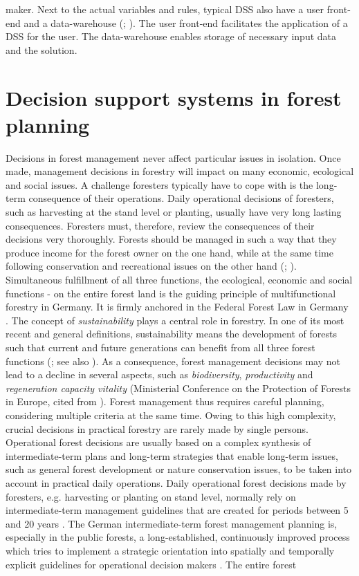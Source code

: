 maker. Next to the actual variables and rules, typical DSS also have a user front-end and a data-warehouse (\citealp[p. 2]{hansen_2012}; \citealp[p. 115]{shim_2002}). The user front-end facilitates the application of a DSS for the user. The data-warehouse enables storage of necessary input data and the solution.

\section{Decision support systems in forest planning}
\label{sec:intro:dss}
Decisions in forest management never affect particular issues in isolation. Once made, management decisions in forestry will impact on many economic, ecological and social issues. A challenge foresters typically have to cope with is the long-term consequence of their operations. Daily operational decisions of foresters, such as harvesting at the stand level or planting, usually have very long lasting consequences. Foresters must, therefore, review the consequences of their decisions very thoroughly. Forests should be managed in such a way that they produce income for the forest owner on the one hand, while at the same time following conservation and recreational issues on the other hand (\citealp[p. 11]{kangas_2015}; \citealp[p. 67]{mohring_1997}). Simultaneous fulfillment of all three functions, the ecological, economic and social functions - on the entire forest land is the guiding principle of multifunctional forestry in Germany. It is firmly anchored in the Federal Forest Law in Germany \citep[p. 457]{moller_2007}. The concept of \textit{sustainability} plays a central role in forestry. In one of its most recent and general definitions, sustainability means the development of forests such that current and future generations can benefit from all three forest functions (\citealp[p. 14]{un_2005}; see also \citealp[p. 14]{kangas_2015}). As a consequence, forest management decisions may not lead to a decline in several aspects, such as \textit{biodiversity}, \textit{productivity} and \textit{regeneration capacity vitality} (Ministerial Conference on the Protection of Forests in Europe, cited from \citealp[p. 15]{kangas_2015}). Forest management thus requires careful planning, considering multiple criteria at the same time. Owing to this high complexity, crucial decisions in practical forestry are rarely made by single persons. Operational forest decisions are usually based on a complex synthesis of intermediate-term plans and long-term strategies that enable long-term issues, such as general forest development or nature conservation issues, to be taken into account in practical daily operations. Daily operational forest decisions made by foresters, e.g. harvesting or planting on stand level, normally rely on intermediate-term management guidelines that are created for periods between 5 and 20 years \citep[p. 12]{kangas_2015}. The German intermediate-term forest management planning is, especially in the public forests, a long-established, continuously improved process which tries to implement a strategic orientation into spatially and temporally explicit guidelines for operational decision makers \citep[p. 156-158]{bockmann_2004}. The entire forest 